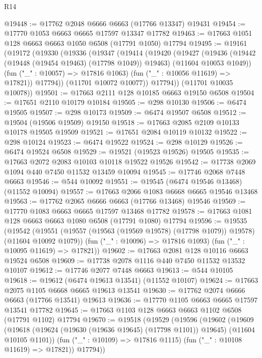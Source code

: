 \begin{lexlean}{R14}
\begin{coremodule}
{{{{{{{{{{{{{{{{{{{{{{{{{{{{{{{{{{{{{{{{{{{{{{{{{{{{{{{{{{{{{{{{{{{{{{{{{{{{{{{{{{@19448 := @17762 @2048 @6666 @6663 (@17766 @13347) @19431
@19454 := @17770 @1053 @6663 @6665 @17597 @13347 @17782
@19463 := @17663 @1051 @128 @6663 @6663 @1050 @6508 (@17791 @1050) @17794
@19495 := @19161
    (@19172
      (@19330
        (@19336
          (@19347
            (@19414
              (@19420
                (@19427
                  (@19436
                    (@19442 (@19448 (@19454 @19463) (@17798 @1049)) @19463)
                    (@11604 @10053 @1049))
                  (fun ("_" : @10057) => @17816 @1063)
                  (fun ("_" : @10056 @11619) => @17821))
                @17794))
            (@11701 @10072 @10077))
          @17794))
      (@11701 @10035 @10078))
@19501 := @17663 @2111 @128 @10185 @6663 @19150 @6508
@19504 := @17651 @2110 @10179 @10184
@19505 := @298 @10130
@19506 := @6474 @19505
@19507 := @298 @10173
@19509 := @6474 @19507 @6508
@19512 := @19504 (@19506 @19509) @19150
@19518 := @17663 @2085 @2109 @10133 @10178 @19505 @19509
@19521 := @17651 @2084 @10119 @10132
@19522 := @298 @10124
@19523 := @6474 @19522
@19524 := @298 @10129
@19526 := @6474 @19524 @6508
@19529 := @19521 (@19523 @19526) @19505
@19535 := @17663 @2072 @2083 @10103 @10118 @19522 @19526
@19542 := @17738 @2069 @1094 @440 @7450 @11532 @13459 @10094
@19545 := @17746 @2068 @7448 @6663
@19546 := @544 @10092
@19551 := @19545 (@6474 @19546 @13468) (@11552 @10094)
@19557 := @17663 @2066 @1083 @6668 @6665 @19546 @13468
@19563 := @17762 @2065 @6666 @6663 (@17766 @13468) @19546
@19569 := @17770 @1083 @6663 @6665 @17597 @13468 @17782
@19578 := @17663 @1081 @128 @6663 @6663 @1080 @6508 (@17791 @1080) @17794
@19596 := @19535
    (@19542
      (@19551 (@19557 (@19563 (@19569 @19578) (@17798 @1079)) @19578) (@11604 @10092 @1079))
      (fun ("_" : @10096) => @17816 @1093)
      (fun ("_" : @10095 @11619) => @17821))
@19602 := @17663 @2081 @128 @10116 @6663 @19524 @6508
@19609 := @17738 @2078 @1116 @440 @7450 @11532 @13532 @10107
@19612 := @17746 @2077 @7448 @6663
@19613 := @544 @10105
@19618 := @19612 (@6474 @19613 @13541) (@11552 @10107)
@19624 := @17663 @2075 @1105 @6668 @6665 @19613 @13541
@19630 := @17762 @2074 @6666 @6663 (@17766 @13541) @19613
@19636 := @17770 @1105 @6663 @6665 @17597 @13541 @17782
@19645 := @17663 @1103 @128 @6663 @6663 @1102 @6508 (@17791 @1102) @17794
@19670 := @19518
    (@19529
      (@19596
        (@19602
          (@19609
            (@19618 (@19624 (@19630 (@19636 @19645) (@17798 @1101)) @19645) (@11604 @10105 @1101))
            (fun ("_" : @10109) => @17816 @1115)
            (fun ("_" : @10108 @11619) => @17821))
          @17794))
}}}}}}}}}}}}}}}}}}}}}}}}}}}}}}}}}}}}}}}}}}}}}}}}}}}}}}}}}}}}}}}}}}}}}}}}}}}}}}}}}}
\end{coremodule}
\end{lexlean}
